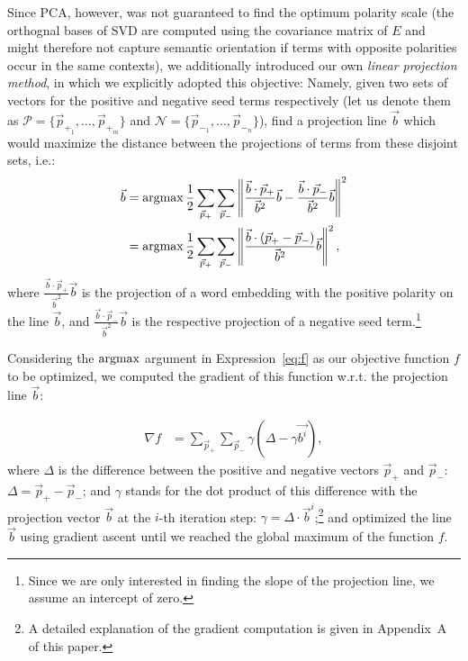 Since PCA, however, was not guaranteed to find the optimum polarity
scale (the orthognal bases of SVD are computed using the covariance
matrix of $E$ and might therefore not capture semantic orientation if
terms with opposite polarities occur in the same contexts), we
additionally introduced our own \emph{linear projection method}, in
which we explicitly adopted this objective: Namely, given two sets of
vectors for the positive and negative seed terms respectively (let us
denote them as $\mathcal{P} = \{\vec{p}_{+_1},\ldots,\vec{p}_{+_m}\}$
and $\mathcal{N} = \{\vec{p}_{-_1},\ldots,\vec{p}_{-_n}\}$), find a
projection line $\vec{b}$ which would maximize the distance between
the projections of terms from these disjoint sets, i.e.: {\small%
\begin{align}
  \small
  \vec{b} &=\argmax\frac{1}{2}\sum_{\vec{p}_+}\sum_{\vec{p}_-}%
  \left\lVert\frac{\vec{b}\cdot\vec{p}_+}{\vec{b}^2}\vec{b}%
  - \frac{\vec{b}\cdot\vec{p}_-}{\vec{b}^2}\vec{b}\right\rVert^2\\
  &=\argmax\frac{1}{2}\sum_{\vec{p}_+}\sum_{\vec{p}_-}\left\lVert\frac{\vec{b}%
    \cdot\left(\vec{p}_{+}-\vec{p}_{-}\right)}{\vec{b}^2}\vec{b}\right\rVert^2,\label{eq:f}%
\end{align}\normalsize}%
where $\frac{\vec{b}\cdot\vec{p}_+}{\vec{b}^2}\vec{b}$ is the
projection of a word embedding with the positive polarity on the line
$\vec{b}$, and $\frac{\vec{b}\cdot\vec{p}_-}{\vec{b}^2}\vec{b}$ is the
respective projection of a negative seed term.\footnote{Since we are
  only interested in finding the slope of the projection line, we
  assume an intercept of zero.}

Considering the $\argmax$ argument in Expression~\ref{eq:f} as our
objective function $f$ to be optimized, we computed the gradient of
this function w.r.t. the projection line $\vec{b}$:

{\small%
  \begin{align}
    \nabla f &= \sum_{\vec{p}_+}\sum_{\vec{p}_-}%
    \gamma\left(\Delta - \gamma\vec{b^{i}}\right),\label{eq:prj-line-grad}%
\end{align}\normalsize}%
where $\Delta$ is the difference between the positive and negative
vectors $\vec{p}_{+}$ and $\vec{p}_{-}$: $\Delta =
\vec{p}_{+}-\vec{p}_{-}$; and $\gamma$ stands for the dot product of
this difference with the projection vector $\vec{b}$ at the $i$-th
iteration step: $\gamma = \Delta \cdot \vec{b}^i$;\footnote{A detailed
  explanation of the gradient computation is given in Appendix~A of
  this paper.} and optimized the line $\vec{b}$ using gradient ascent
until we reached the global maximum of the function $f$.


